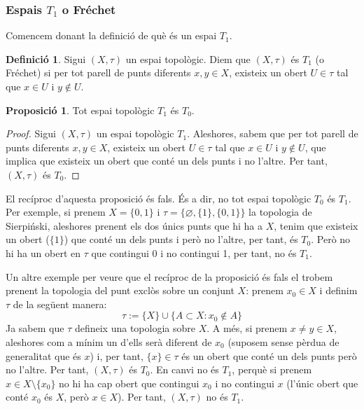 \documentclass[10pt,a4paper]{article}
\theoremstyle{definition}
\newtheorem{definition}[theorem]{Definició}
\newtheorem{prop}[theorem]{Proposició}
\begin{document}
\subsubsection*{Espais $T_1$ o Fréchet}
Comencem donant la definició de què és un espai $T_1$.
\begin{definition}
      Sigui $(X,\tau)$ un espai topològic. Diem que $(X,\tau)$ és $T_1$ (o Fréchet) si per tot parell de punts diferents $x,y\in X$, existeix un obert $U\in\tau$ tal que $x\in U$ i $y\notin U$.
\end{definition}
\begin{prop}
      Tot espai topològic $T_1$ és $T_0$.
\end{prop}
\begin{proof}
      Sigui $(X,\tau)$ un espai topològic $T_1$. Aleshores, sabem que per tot parell de punts diferents $x,y\in X$, existeix un obert $U\in\tau$ tal que $x\in U$ i $y\notin U$, que implica que existeix un obert que conté un dels punts i no l'altre. Per tant, $(X,\tau)$ és $T_0$.
\end{proof}
El recíproc d'aquesta proposició és fals. És a dir, no tot espai topològic $T_0$ és $T_1$. Per exemple, si prenem $X=\{0,1\}$ i $\tau=\{\varnothing,\{1\},\{0,1\}\}$ la topologia de Sierpiński, aleshores prenent els dos únics punts que hi ha a $X$, tenim que existeix un obert ($\{1\}$) que conté un dels punts i però no l'altre, per tant, és $T_0$. Però no hi ha un obert en $\tau$ que contingui 0 i no contingui 1, per tant, no és $T_1$.

Un altre exemple per veure que el recíproc de la proposició és fals el trobem prenent la topologia del punt exclòs sobre un conjunt $X$: prenem $x_0\in X$ i definim $\tau$ de la següent manera: $$\tau:=\{X\}\cup\{A\subset X:x_0\notin A\}$$ Ja sabem que $\tau$ defineix una topologia sobre $X$. A més, si prenem $x\ne y\in X$, aleshores com a mínim un d'ells serà diferent de $x_0$ (suposem sense pèrdua de generalitat que és $x$) i, per tant, $\{x\}\in\tau$ és un obert que conté un dels punts però no l'altre. Per tant, $(X,\tau)$ és $T_0$. En canvi no és $T_1$, perquè si prenem $x\in X\setminus\{x_0\}$ no hi ha cap obert que contingui $x_0$ i no contingui $x$ (l'únic obert que conté $x_0$ és $X$, però $x\in X$). Per tant, $(X,\tau)$ no és $T_1$.
\end{document}
